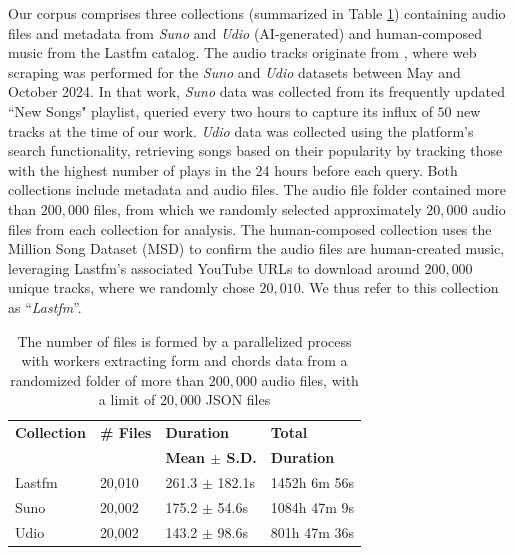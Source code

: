 \documentclass{article}
\begin{document}
Our corpus comprises three collections (summarized in Table \ref{tab:datasets}) containing audio files and metadata from \textit{Suno} and \textit{Udio} (AI-generated) and human-composed music from the Lastfm catalog. The audio tracks originate from \citet{cros2025ai}, where web scraping was performed for the \textit{Suno} and \textit{Udio} datasets between May and October 2024. In that work, \textit{Suno} data was collected from its frequently updated ``New Songs" playlist, queried every two hours to capture its influx of $50$ new tracks at the time of our work. \textit{Udio} data was collected using the platform's search functionality, retrieving songs based on their popularity by tracking those with the highest number of plays in the 24 hours before each query. Both collections include metadata and audio files. The audio file folder contained more than $200,000$ files, from which we randomly selected approximately $20,000$ audio files from each collection for analysis. The human-composed collection uses the Million Song Dataset (MSD) \citep{Bertin-Mahieux2011} to confirm the audio files are human-created music, leveraging Lastfm's associated YouTube URLs to download around $200,000$ unique tracks, where we randomly chose $20,010$. We thus refer to this collection as ``\textit{Lastfm}''.


\begin{table}[htpb]
\centering
\footnotesize
\begin{tabular}{llll}
\toprule
\textbf{Collection} & \textbf{\# Files} & \textbf{Duration} & \textbf{Total} \\
& \textbf{} & \textbf{Mean $\pm$ S.D.} & \textbf{Duration} \\
\midrule
    Lastfm & 20,010 & 261.3 $\pm$ 182.1s & 1452h 6m 56s \\
    Suno & 20,002 & 175.2 $\pm$ 54.6s & 1084h 47m 9s \\
    Udio & 20,002 & 143.2 $\pm$ 98.6s & 801h 47m 36s \\
\bottomrule
\end{tabular}

\caption{The number of files is formed by a parallelized process with workers extracting form and chords data from a randomized folder of more than $200,000$ audio files, with a limit of $20,000$ JSON files}
\label{tab:datasets}
\end{table}
\end{document}
